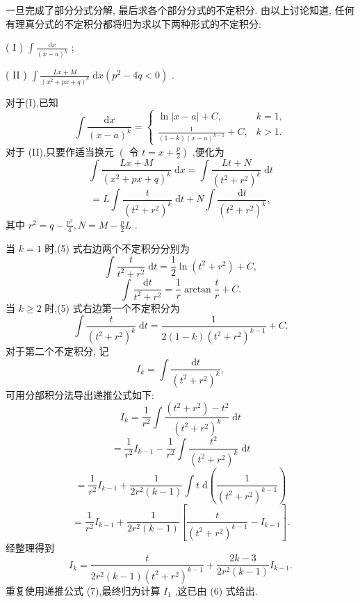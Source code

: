 一旦完成了部分分式分解, 最后求各个部分分式的不定积分. 由以上讨论知道, 任何有理真分式的不定积分都将归为求以下两种形式的不定积分:

( I ) \(\int \frac{\mathrm{d}x}{{\left( x - a\right) }^{k}}\) ;

( II ) \(\int \frac{{Lx} + M}{{\left( {x}^{2} + px + q\right) }^{k}}\mathrm{\;d}x\left( {{p}^{2} - {4q} < 0}\right)\) .

对于(I),已知
\[
\int \frac{\mathrm{d}x}{{\left( x - a\right) }^{k}} = \left\{  \begin{matrix} \ln \left| {x - a}\right|  + C, & k = 1, \\  \frac{1}{\left( {1 - k}\right) {\left( x - a\right) }^{k - 1}} + C, & k > 1. \end{matrix}\right.
\]
对于 (II),只要作适当换元 \(\left( {\text{ 令 }t = x + \frac{p}{2}}\right)\) ,便化为
\[
\int \frac{{Lx} + M}{{\left( {x}^{2} + px + q\right) }^{k}}\mathrm{\;d}x = \int \frac{{Lt} + N}{{\left( {t}^{2} + {r}^{2}\right) }^{k}}\mathrm{\;d}t
\]
\[
= L\int \frac{t}{{\left( {t}^{2} + {r}^{2}\right) }^{k}}\mathrm{\;d}t + N\int \frac{\mathrm{d}t}{{\left( {t}^{2} + {r}^{2}\right) }^{k}}, \tag{5}
\]
其中 \({r}^{2} = q - \frac{{p}^{2}}{4},N = M - \frac{p}{2}L\) .

当 \(k = 1\) 时,(5) 式右边两个不定积分分别为
\[
\int \frac{t}{{t}^{2} + {r}^{2}}\mathrm{\;d}t = \frac{1}{2}\ln \left( {{t}^{2} + {r}^{2}}\right)  + C,
\]
\[
\int \frac{\mathrm{d}t}{{t}^{2} + {r}^{2}} = \frac{1}{r}\arctan \frac{t}{r} + C. \tag{6}
\]
当 \(k \geq  2\) 时,(5) 式右边第一个不定积分为
\[
\int \frac{t}{{\left( {t}^{2} + {r}^{2}\right) }^{k}}\mathrm{\;d}t = \frac{1}{2\left( {1 - k}\right) {\left( {t}^{2} + {r}^{2}\right) }^{k - 1}} + C.
\]
对于第二个不定积分, 记
\[
{I}_{k} = \int \frac{\mathrm{d}t}{{\left( {t}^{2} + {r}^{2}\right) }^{k}},
\]
可用分部积分法导出递推公式如下:
\[
{I}_{k} = \frac{1}{{r}^{2}}\int \frac{\left( {{t}^{2} + {r}^{2}}\right)  - {t}^{2}}{{\left( {t}^{2} + {r}^{2}\right) }^{k}}\mathrm{\;d}t
\]
\[
= \frac{1}{{r}^{2}}{I}_{k - 1} - \frac{1}{{r}^{2}}\int \frac{{t}^{2}}{{\left( {t}^{2} + {r}^{2}\right) }^{k}}\mathrm{\;d}t
\]
\[
= \frac{1}{{r}^{2}}{I}_{k - 1} + \frac{1}{2{r}^{2}\left( {k - 1}\right) }\int t\mathrm{\;d}\left( \frac{1}{{\left( {t}^{2} + {r}^{2}\right) }^{k - 1}}\right)
\]
\[
= \frac{1}{{r}^{2}}{I}_{k - 1} + \frac{1}{2{r}^{2}\left( {k - 1}\right) }\left\lbrack  {\frac{t}{{\left( {t}^{2} + {r}^{2}\right) }^{k - 1}} - {I}_{k - 1}}\right\rbrack  .
\]
经整理得到
\[
{I}_{k} = \frac{t}{2{r}^{2}\left( {k - 1}\right) {\left( {t}^{2} + {r}^{2}\right) }^{k - 1}} + \frac{{2k} - 3}{2{r}^{2}\left( {k - 1}\right) }{I}_{k - 1}. \tag{7}
\]
重复使用递推公式 (7),最终归为计算 \({I}_{1}\) ,这已由 (6) 式给出.

